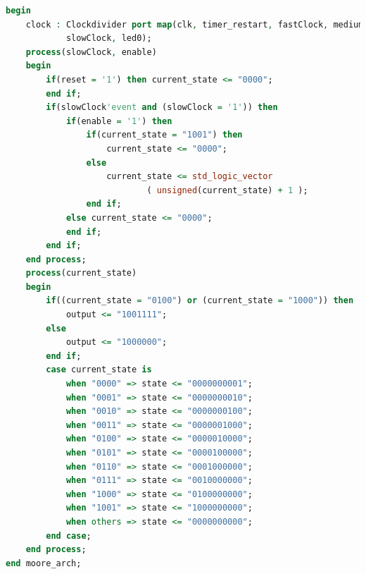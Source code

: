 \documentclass[11pt]{article}
\begin{document}
\begin{appendices}
\begin{lstlisting}[language=VHDL]
begin  
    clock : Clockdivider port map(clk, timer_restart, fastClock, mediumClock, 
    		slowClock, led0);
    process(slowClock, enable)
    begin
        if(reset = '1') then current_state <= "0000";
        end if;
        if(slowClock'event and (slowClock = '1')) then
            if(enable = '1') then
                if(current_state = "1001") then
                    current_state <= "0000";
                else
                    current_state <= std_logic_vector
                    		( unsigned(current_state) + 1 );
                end if;
            else current_state <= "0000";
            end if;
        end if;
    end process;
    process(current_state)
    begin
        if((current_state = "0100") or (current_state = "1000")) then
            output <= "1001111";
        else
            output <= "1000000";
        end if;
        case current_state is
            when "0000" => state <= "0000000001";
            when "0001" => state <= "0000000010";
            when "0010" => state <= "0000000100";
            when "0011" => state <= "0000001000";
            when "0100" => state <= "0000010000";
            when "0101" => state <= "0000100000";
            when "0110" => state <= "0001000000";
            when "0111" => state <= "0010000000";
            when "1000" => state <= "0100000000";
            when "1001" => state <= "1000000000";
            when others => state <= "0000000000";
        end case;
    end process;
end moore_arch;

\end{lstlisting}


\end{appendices}
\end{document}
